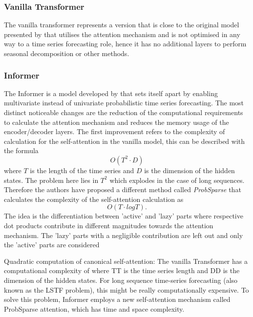 \documentclass{article}
\begin{document}
\subsubsection{Vanilla Transformer}

The vanilla transformer represents a version that is close to the original model presented by \cite{vanilla-transformer} that utilises the attention mechanism and is not optimised in any way to a time series forecasting role, hence it has no additional layers to perform seasonal decomposition or other methods.

\subsubsection{Informer}

The Informer is a model developed by \cite{Informer} that sets itself apart by enabling multivariate instead of univariate probabilistic time series forecasting. The most distinct noticeable changes are the reduction of the computational requirements to calculate the attention mechanism and reduces the memory usage of the encoder/decoder layers. The first improvement refers to the complexity of calculation for the self-attention in the vanilla model, this can be described with the formula
\begin{equation*}
    O(T^2 \cdot D)
\end{equation*}
where $T$ is the length of the time series and $D$ is the dimension of the hidden states. The problem here lies in $T^2$ which explodes in the case of long sequences. Therefore the authors have proposed a different method called \textit{ProbSparse} that calculates the complexity of the self-attention calculation as
\begin{equation*}
    O(T \cdot log{T}) .
\end{equation*}
The idea is the differentiation between 'active' and 'lazy' parts where respective dot products contribute in different magnitudes towards the attention mechanism. The 'lazy' parts with a negligible contribution are left out and only the 'active' parts are considered



    Quadratic computation of canonical self-attention:
    The vanilla Transformer has a computational complexity of  where TT is the time series length and DD is the dimension of the hidden states. For long sequence time-series forecasting (also known as the LSTF problem), this might be really computationally expensive. To solve this problem, Informer employs a new self-attention mechanism called ProbSparse attention, which has time and space complexity.
    
\end{document}

